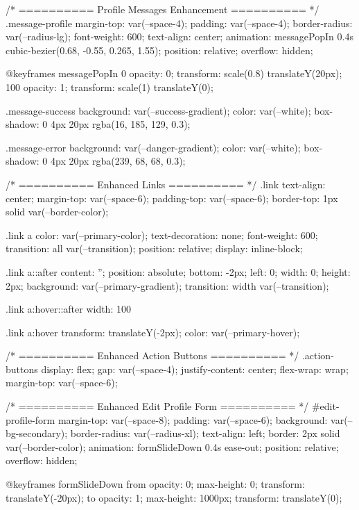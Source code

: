 {{{{/* ========== Profile Messages Enhancement ========== */
.message-profile {
  margin-top: var(--space-4);
  padding: var(--space-4);
  border-radius: var(--radius-lg);
  font-weight: 600;
  text-align: center;
  animation: messagePopIn 0.4s cubic-bezier(0.68, -0.55, 0.265, 1.55);
  position: relative;
  overflow: hidden;
}

@keyframes messagePopIn {
  0%
    opacity: 0;
    transform: scale(0.8) translateY(20px);
  }
  100%
    opacity: 1;
    transform: scale(1) translateY(0);
  }
}

.message-success {
  background: var(--success-gradient);
  color: var(--white);
  box-shadow: 0 4px 20px rgba(16, 185, 129, 0.3);
}

.message-error {
  background: var(--danger-gradient);
  color: var(--white);
  box-shadow: 0 4px 20px rgba(239, 68, 68, 0.3);
}

/* ========== Enhanced Links ========== */
.link {
  text-align: center;
  margin-top: var(--space-6);
  padding-top: var(--space-6);
  border-top: 1px solid var(--border-color);
}

.link a {
  color: var(--primary-color);
  text-decoration: none;
  font-weight: 600;
  transition: all var(--transition);
  position: relative;
  display: inline-block;
}

.link a::after {
  content: '';
  position: absolute;
  bottom: -2px;
  left: 0;
  width: 0;
  height: 2px;
  background: var(--primary-gradient);
  transition: width var(--transition);
}

.link a:hover::after {
  width: 100%
}

.link a:hover {
  transform: translateY(-2px);
  color: var(--primary-hover);
}

/* ========== Enhanced Action Buttons ========== */
.action-buttons {
  display: flex;
  gap: var(--space-4);
  justify-content: center;
  flex-wrap: wrap;
  margin-top: var(--space-6);
}

/* ========== Enhanced Edit Profile Form ========== */
#edit-profile-form {
  margin-top: var(--space-8);
  padding: var(--space-6);
  background: var(--bg-secondary);
  border-radius: var(--radius-xl);
  text-align: left;
  border: 2px solid var(--border-color);
  animation: formSlideDown 0.4s ease-out;
  position: relative;
  overflow: hidden;
}

@keyframes formSlideDown {
  from {
    opacity: 0;
    max-height: 0;
    transform: translateY(-20px);
  }
  to {
    opacity: 1;
    max-height: 1000px;
    transform: translateY(0);
  }
}

}}
